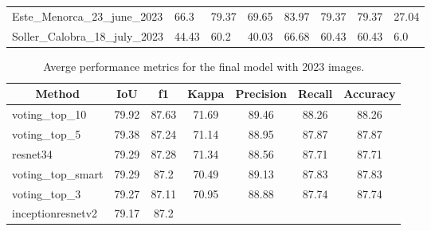 \begin{table}[H]
\begin{tabular}{llllllll}
        \\
        Este\_Menorca\_23\_june\_2023          & 66.3      & 79.37      &
        69.65                                  & 83.97     &
        79.37                                  & 79.37     & 27.04
        \\
        Soller\_Calobra\_18\_july\_2023        & 44.43     & 60.2       &
        40.03                                  & 66.68     &
        60.43                                  & 60.43     & 6.0
        \\ \bottomrule
    \end{tabular}%
\end{table}

\begin{table}[H]
    \centering
    \caption{Averge performance metrics for the final model with 2023 images.}
    \label{tab:avg_performance_2023}
    \begin{tabular}{lcccccc}
        \toprule
        \multicolumn{1}{c}{\textbf{Method}} & \textbf{IoU}       &
        \textbf{f1}                         &
        \textbf{Kappa}                      & \textbf{Precision} &
        \textbf{Recall}                     & \textbf{Accuracy}
        \\ \midrule
        voting\_top\_10                     & 79.92              & 87.63
                                            & 71.69              & 89.46 &
        88.26                               & 88.26
        \\
        voting\_top\_5                      & 79.38              & 87.24
                                            & 71.14              & 88.95 &
        87.87                               & 87.87
        \\
        resnet34                            & 79.29              & 87.28
                                            & 71.34              & 88.56 &
        87.71                               & 87.71
        \\
        voting\_top\_smart                  & 79.29              & 87.2
                                            & 70.49              & 89.13 &
        87.83                               & 87.83
        \\
        voting\_top\_3                      & 79.27              & 87.11
                                            & 70.95              & 88.88 &
        87.74                               & 87.74
        \\
        inceptionresnetv2                   & 79.17              & 87.2

\end{tabular}
\end{table}
